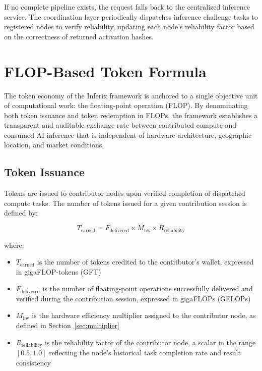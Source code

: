 \documentclass[12pt]{article}
\begin{document}
If no complete pipeline exists, the request falls back to the centralized inference service. The coordination layer periodically dispatches inference challenge tasks to registered nodes to verify reliability, updating each node's reliability factor based on the correctness of returned activation hashes.

\section{FLOP-Based Token Formula}
\label{sec:token}

The token economy of the Inferix framework is anchored to a single objective unit of computational work: the floating-point operation (FLOP). By denominating both token issuance and token redemption in FLOPs, the framework establishes a transparent and auditable exchange rate between contributed compute and consumed AI inference that is independent of hardware architecture, geographic location, and market conditions.

\subsection{Token Issuance}

Tokens are issued to contributor nodes upon verified completion of dispatched compute tasks. The number of tokens issued for a given contribution session is defined by:

\begin{equation}
T_{\text{earned}} = F_{\text{delivered}} \times M_{\text{hw}} \times R_{\text{reliability}}
\label{eq:issuance}
\end{equation}

where:
\begin{itemize}
    \item $T_{\text{earned}}$ is the number of tokens credited to the contributor's wallet, expressed in gigaFLOP-tokens (GFT)
    \item $F_{\text{delivered}}$ is the number of floating-point operations successfully delivered and verified during the contribution session, expressed in gigaFLOPs (GFLOPs)
    \item $M_{\text{hw}}$ is the hardware efficiency multiplier assigned to the contributor node, as defined in Section~\ref{sec:multiplier}
    \item $R_{\text{reliability}}$ is the reliability factor of the contributor node, a scalar in the range $[0.5, 1.0]$ reflecting the node's historical task completion rate and result consistency
\end{itemize}
\end{document}

